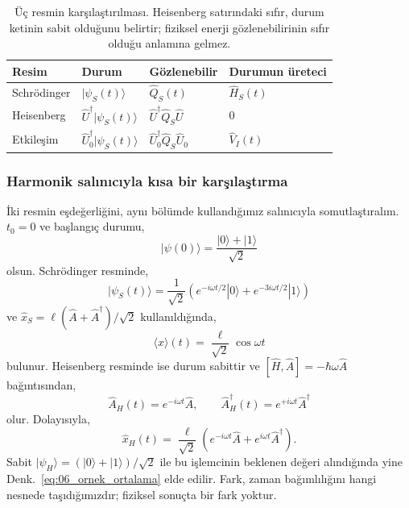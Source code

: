 \documentclass[00_kitap.tex]{subfiles}
\begin{document}
\begin{table}[hbtp]
 \centering
 \small
 \begin{tabular}{llll}
 \hline
 Resim & Durum & Gözlenebilir & Durumun üreteci\\
 \hline
 Schrödinger & $|\psi_S(t)\rangle$ & $\hat Q_S(t)$ & $\hat H_S(t)$\\[4pt]
 Heisenberg & $\hat U^\dagger|\psi_S(t)\rangle$ & $\hat U^\dagger\hat Q_S\hat U$ & $0$\\[4pt]
 Etkileşim & $\hat U_0^\dagger|\psi_S(t)\rangle$ & $\hat U_0^\dagger\hat Q_S\hat U_0$ & $\hat V_I(t)$\\[4pt]
 \hline
 \end{tabular}
 \caption{Üç resmin karşılaştırılması. Heisenberg satırındaki
 sıfır, durum ketinin sabit olduğunu belirtir; fiziksel enerji
 gözlenebilirinin sıfır olduğu anlamına gelmez.}
 \label{tab:06_resimler}
\end{table}

\subsubsection{Harmonik salınıcıyla kısa bir karşılaştırma}

İki resmin eşdeğerliğini, aynı bölümde kullandığımız salınıcıyla
somutlaştıralım. $t_0=0$ ve başlangıç durumu,
\begin{equation}
 |\psi(0)\rangle=\frac{|0\rangle+|1\rangle}{\sqrt2}
\end{equation}
olsun. Schrödinger resminde,
\begin{equation}
 |\psi_S(t)\rangle=\frac{1}{\sqrt2}
 \left(e^{-i\omega t/2}|0\rangle+e^{-3i\omega t/2}|1\rangle\right)
\end{equation}
ve $\hat x_S=\ell(\hat A+\hat A^\dagger)/\sqrt2$ kullanıldığında,
\begin{equation}
 \langle x\rangle(t)=\frac{\ell}{\sqrt2}\cos\omega t
 \label{eq:06_ornek_ortalama}
\end{equation}
bulunur. Heisenberg resminde ise durum sabittir ve
$[\hat H,\hat A]=-\hbar\omega\hat A$ bağıntısından,
\begin{equation}
 \hat A_H(t)=e^{-i\omega t}\hat A,\qquad
 \hat A_H^\dagger(t)=e^{+i\omega t}\hat A^\dagger
\end{equation}
olur. Dolayısıyla,
\begin{equation}
 \hat x_H(t)=\frac{\ell}{\sqrt2}
       \left(e^{-i\omega t}\hat A+e^{i\omega t}\hat A^\dagger\right).
\end{equation}
Sabit $|\psi_H\rangle=(|0\rangle+|1\rangle)/\sqrt2$ ile bu
işlemcinin beklenen değeri alındığında yine
Denk.~\eqref{eq:06_ornek_ortalama} elde edilir. Fark,
zaman bağımlılığını hangi nesnede taşıdığımızdır; fiziksel sonuçta
bir fark yoktur.
\end{document}
